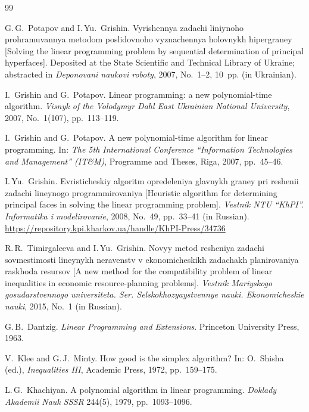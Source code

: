 \documentclass[11pt,a4paper]{article}
\theoremstyle{plain}
\theoremstyle{definition}
\theoremstyle{remark}
\begin{document}
\begin{thebibliography}{99}\small

G.\,G.~Potapov and I.\,Yu.~Grishin.
Vyrishennya zadachi liniynoho prohramuvannya metodom poslidovnoho vyznachennya holovnykh
hipergraney [Solving the linear programming problem by sequential determination of principal
hyperfaces].
Deposited at the State Scientific and Technical Library of Ukraine; abstracted in
\emph{Deponovani naukovi roboty}, 2007, No.~1--2, 10~pp. (in Ukrainian).

I.~Grishin and G.~Potapov.
Linear programming: a new polynomial-time algorithm.
\emph{Visnyk of the Volodymyr Dahl East Ukrainian National University}, 2007, No.~1(107),
pp.~113--119.

I.~Grishin and G.~Potapov.
A new polynomial-time algorithm for linear programming.
In: \emph{The 5th International Conference ``Information Technologies and Management''
(IT\&M)}, Programme and Theses, Riga, 2007, pp.~45--46.

I.\,Yu.~Grishin.
Evristicheskiy algoritm opredeleniya glavnykh graney pri reshenii zadachi lineynogo
programmirovaniya [Heuristic algorithm for determining principal faces in solving the linear
programming problem].
\emph{Vestnik NTU ``KhPI''. Informatika i modelirovanie}, 2008, No.~49, pp.~33--41 (in Russian).
\url{https://repository.kpi.kharkov.ua/handle/KhPI-Press/34736}

R.\,R.~Timirgaleeva and I.\,Yu.~Grishin.
Novyy metod resheniya zadachi sovmestimosti lineynykh neravenstv v ekonomicheskikh zadachakh
planirovaniya raskhoda resursov [A new method for the compatibility problem of linear
inequalities in economic resource-planning problems].
\emph{Vestnik Mariyskogo gosudarstvennogo universiteta. Ser. Selskokhozyaystvennye nauki.
Ekonomicheskie nauki}, 2015, No.~1 (in Russian).

G.\,B.~Dantzig.
\emph{Linear Programming and Extensions}.
Princeton University Press, 1963.

V.~Klee and G.\,J.~Minty.
How good is the simplex algorithm?
In: O.~Shisha (ed.), \emph{Inequalities III}, Academic Press, 1972, pp.~159--175.

L.\,G.~Khachiyan.
A polynomial algorithm in linear programming.
\emph{Doklady Akademii Nauk SSSR} 244(5), 1979, pp.~1093--1096.


\end{thebibliography}
\end{document}
